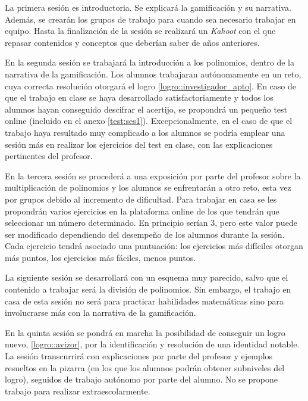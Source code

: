 \label{ResumenSesion1}
%
La primera sesión es introductoria.
%
Se explicará la gamificación y su narrativa. 
%
Además, se crearán los grupos de trabajo para cuando sea necesario trabajar en equipo.
%
Hasta la finalización de la sesión se realizará un \textit{Kahoot} con el que repasar contenidos y conceptos que deberían saber de años anteriores.

\label{ResumenSesion2}
%
En la segunda sesión se trabajará la introducción a los polinomios, dentro de la narrativa de la gamificación. 
%
Los alumnos trabajaran autónomamente en un reto, cuya correcta resolución otorgará el logro \ref{logro::investigador_apto}.
%
En caso de que el trabajo en clase se haya desarrollado satisfactoriamente y todos los alumnos hayan conseguido descifrar el acertijo, se propondrá un pequeño test online (incluido en el anexo \ref{test:ses1}).
%
Excepcionalmente, en el caso de que el trabajo haya resultado muy complicado a los alumnos se podría emplear una sesión más en realizar los ejercicios del test en clase, con las explicaciones pertinentes del profesor.

\label{ResumenSesion3}
%
En la tercera sesión se procederá a una exposición por parte del profesor sobre la multiplicación de polinomios y los alumnos se enfrentarán a otro reto, esta vez por grupos debido al incremento de dificultad.
%
Para trabajar en casa se les propondrán varios ejercicios en la plataforma online de los que tendrán que seleccionar un número determinado. 
%
En principio serían 3, pero este valor puede ser modificado dependiendo del desempeño de los alumnos durante la sesión.
%
Cada ejercicio tendrá asociado una puntuación: los ejercicios más difíciles otorgan más puntos, los ejercicios más fáciles, menos puntos.

\label{ResumenSesion4}
%
La siguiente sesión se desarrollará con un esquema muy parecido, salvo que el contenido a trabajar será la división de polinomios.
%
Sin embargo, el trabajo en casa de esta sesión no será para practicar habilidades matemáticas sino para involucrarse más con la narrativa de la gamificación.

\label{ResumenSesion5}
%
En la quinta sesión se pondrá en marcha la posibilidad de conseguir un logro nuevo, \ref{logro::avizor}, por la identificación y resolución de una identidad notable.
%
La sesión transcurrirá con explicaciones por parte del profesor y ejemplos resueltos en la pizarra (en los que los alumnos podrán obtener subniveles del logro), seguidos de trabajo autónomo por parte del alumno.
%
No se propone trabajo para realizar extraescolarmente.

